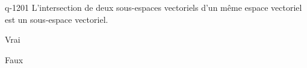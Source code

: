 \begin{truefalse}{q-1201}
L'intersection de deux sous-espaces vectoriels d'un même espace vectoriel est un sous-espace vectoriel.
\item* Vrai
\item Faux
\end{truefalse}

